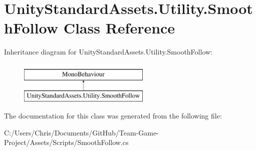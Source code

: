 \hypertarget{class_unity_standard_assets_1_1_utility_1_1_smooth_follow}{}\section{Unity\+Standard\+Assets.\+Utility.\+Smooth\+Follow Class Reference}
\label{class_unity_standard_assets_1_1_utility_1_1_smooth_follow}
Inheritance diagram for Unity\+Standard\+Assets.\+Utility.\+Smooth\+Follow\+:\begin{figure}[H]
\begin{center}
\leavevmode
\includegraphics[height=2.000000cm]{class_unity_standard_assets_1_1_utility_1_1_smooth_follow}
\end{center}
\end{figure}


The documentation for this class was generated from the following file\+:\begin{DoxyCompactItemize}
\item 
C\+:/\+Users/\+Chris/\+Documents/\+Git\+Hub/\+Team-\/\+Game-\/\+Project/\+Assets/\+Scripts/Smooth\+Follow.\+cs\end{DoxyCompactItemize}
